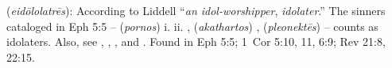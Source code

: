 \item[Idolater,]

(\textit{eidōlolatrēs}):
According to Liddell ``\emph{an idol-worshipper}, \emph{idolater}.'' The sinners cataloged in Eph 5:5 --  (\emph{pornos}) i.  ii. ,  (\emph{akathartos}) ,  (\emph{pleonektēs})  -- counts as idolaters. Also, see , , , and .
Found in Eph 5:5; 1~Cor 5:10, 11, 6:9; Rev 21:8, 22:15.
